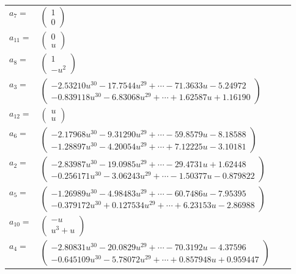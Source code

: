 \documentclass[1p]{elsarticle_modified}
\theoremstyle{definition}
\begin{document}
\begin{tabular}{m{7pt} m{180pt} m{7pt} m{180pt} }
\flushright $a_{7}=$&$\begin{pmatrix}1\\0\end{pmatrix}$ \\
\flushright $a_{11}=$&$\begin{pmatrix}0\\u\end{pmatrix}$ \\
\flushright $a_{8}=$&$\begin{pmatrix}1\\- u^2\end{pmatrix}$ \\
\flushright $a_{3}=$&$\begin{pmatrix}-2.53210 u^{30}-17.7544 u^{29}+\cdots-71.3633 u-5.24972\\-0.839118 u^{30}-6.83068 u^{29}+\cdots+1.62587 u+1.16190\end{pmatrix}$ \\
\flushright $a_{12}=$&$\begin{pmatrix}u\\u\end{pmatrix}$ \\
\flushright $a_{6}=$&$\begin{pmatrix}-2.17968 u^{30}-9.31290 u^{29}+\cdots-59.8579 u-8.18588\\-1.28897 u^{30}-4.20054 u^{29}+\cdots+7.12225 u-3.10181\end{pmatrix}$ \\
\flushright $a_{2}=$&$\begin{pmatrix}-2.83987 u^{30}-19.0985 u^{29}+\cdots-29.4731 u+1.62448\\-0.256171 u^{30}-3.06243 u^{29}+\cdots-1.50377 u-0.879822\end{pmatrix}$ \\
\flushright $a_{5}=$&$\begin{pmatrix}-1.26989 u^{30}-4.98483 u^{29}+\cdots-60.7486 u-7.95395\\-0.379172 u^{30}+0.127534 u^{29}+\cdots+6.23153 u-2.86988\end{pmatrix}$ \\
\flushright $a_{10}=$&$\begin{pmatrix}- u\\u^3+u\end{pmatrix}$ \\
\flushright $a_{4}=$&$\begin{pmatrix}-2.80831 u^{30}-20.0829 u^{29}+\cdots-70.3192 u-4.37596\\-0.645109 u^{30}-5.78072 u^{29}+\cdots+0.857948 u+0.959447\end{pmatrix}$ \\

\end{tabular}
\end{document}
